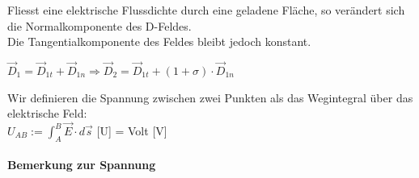 \beginip
Fliesst eine elektrische Flussdichte durch eine geladene Fläche, so verändert sich die Normalkomponente des D-Feldes. \\
Die Tangentialkomponente des Feldes bleibt jedoch konstant. \\
\begin{center}
\end{center}
\formulaBegin
$\vec{D}_1 = \vec{D}_{1t} + \vec{D}_{1n} \Rightarrow \vec{D}_2 = \vec{D}_{1t} + (1 + \sigma) \cdot \vec{D}_{1n}$
\formulaEnd
\iend


\beginip
Wir definieren die Spannung zwischen zwei Punkten als das Wegintegral über das elektrische Feld: \\
\formulaBegin
$ U_{AB} :=  \int_A^B \vec{E} \cdot d\vec{s} $
\formulaEnd
{[U]} = Volt {[V]}
\iend

\paragraph{Bemerkung zur Spannung}

